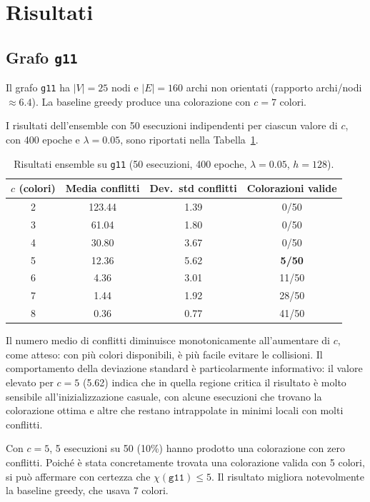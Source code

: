 \documentclass[11pt, a4paper]{article}
\begin{document}
\section{Risultati}

\subsection*{Grafo \texttt{g11}}

Il grafo \texttt{g11} ha $|V| = 25$ nodi e $|E| = 160$ archi non orientati (rapporto
archi/nodi $\approx 6.4$). La baseline greedy produce una colorazione con $c = 7$ colori.

I risultati dell'ensemble con 50 esecuzioni indipendenti per ciascun valore di $c$, con
400 epoche e $\lambda = 0.05$, sono riportati nella Tabella~\ref{tab:g11}.

\begin{table}[h]
\centering
\caption{Risultati ensemble su \texttt{g11} (50 esecuzioni, 400 epoche, $\lambda = 0.05$, $h = 128$).}
\label{tab:g11}
\begin{tabular}{cccc}
\toprule
$c$ (colori) & Media conflitti & Dev.\ std conflitti & Colorazioni valide \\
\midrule
2 & 123.44 & 1.39 & 0/50 \\
3 & 61.04  & 1.80 & 0/50 \\
4 & 30.80  & 3.67 & 0/50 \\
5 & 12.36  & 5.62 & \textbf{5/50} \\
6 &  4.36  & 3.01 & 11/50 \\
7 &  1.44  & 1.92 & 28/50 \\
8 &  0.36  & 0.77 & 41/50 \\
\bottomrule
\end{tabular}
\end{table}

Il numero medio di conflitti diminuisce monotonicamente all'aumentare di $c$, come atteso:
con più colori disponibili, è più facile evitare le collisioni. Il comportamento della
deviazione standard è particolarmente informativo: il valore elevato per $c = 5$ (5.62)
indica che in quella regione critica il risultato è molto sensibile all'inizializzazione
casuale, con alcune esecuzioni che trovano la colorazione ottima e altre che restano
intrappolate in minimi locali con molti conflitti.

Con $c = 5$, 5 esecuzioni su 50 (10\%) hanno prodotto una colorazione con zero conflitti.
Poiché è stata concretamente trovata una colorazione valida con 5 colori, si può affermare
con certezza che $\chi(\texttt{g11}) \leq 5$. Il risultato migliora notevolmente la
baseline greedy, che usava 7 colori.
\end{document}

